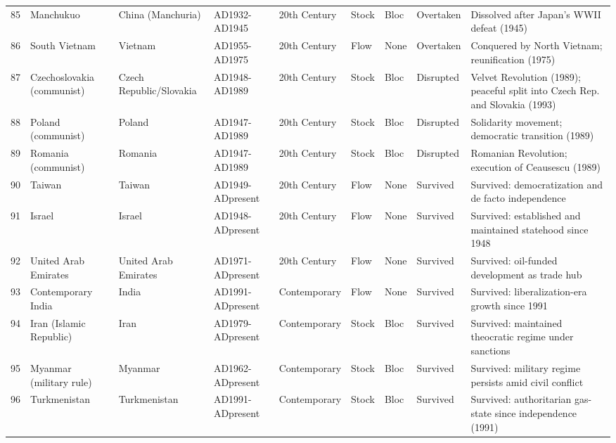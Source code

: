 \documentclass[11pt]{article}
\begin{document}
\begin{longtable}{rlllllllp{6cm}}
85 & Manchukuo & China (Manchuria) & AD1932-AD1945 & 20th Century & Stock & Bloc & Overtaken & Dissolved after Japan's WWII defeat (1945) \\
86 & South Vietnam & Vietnam & AD1955-AD1975 & 20th Century & Flow & None & Overtaken & Conquered by North Vietnam; reunification (1975) \\
87 & Czechoslovakia (communist) & Czech Republic/Slovakia & AD1948-AD1989 & 20th Century & Stock & Bloc & Disrupted & Velvet Revolution (1989); peaceful split into Czech Rep. and Slovakia (1993) \\
88 & Poland (communist) & Poland & AD1947-AD1989 & 20th Century & Stock & Bloc & Disrupted & Solidarity movement; democratic transition (1989) \\
89 & Romania (communist) & Romania & AD1947-AD1989 & 20th Century & Stock & Bloc & Disrupted & Romanian Revolution; execution of Ceausescu (1989) \\
90 & Taiwan & Taiwan & AD1949-ADpresent & 20th Century & Flow & None & Survived & Survived: democratization and de facto independence \\
91 & Israel & Israel & AD1948-ADpresent & 20th Century & Flow & None & Survived & Survived: established and maintained statehood since 1948 \\
92 & United Arab Emirates & United Arab Emirates & AD1971-ADpresent & 20th Century & Flow & None & Survived & Survived: oil-funded development as trade hub \\
93 & Contemporary India & India & AD1991-ADpresent & Contemporary & Flow & None & Survived & Survived: liberalization-era growth since 1991 \\
94 & Iran (Islamic Republic) & Iran & AD1979-ADpresent & Contemporary & Stock & Bloc & Survived & Survived: maintained theocratic regime under sanctions \\
95 & Myanmar (military rule) & Myanmar & AD1962-ADpresent & Contemporary & Stock & Bloc & Survived & Survived: military regime persists amid civil conflict \\
96 & Turkmenistan & Turkmenistan & AD1991-ADpresent & Contemporary & Stock & Bloc & Survived & Survived: authoritarian gas-state since independence (1991) \\
\end{longtable}
\end{document}
